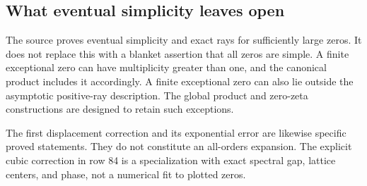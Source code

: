 \subsection{What eventual simplicity leaves open}
The source proves eventual simplicity and exact rays for sufficiently large zeros. It does not replace this with a blanket assertion that all zeros are simple. A finite exceptional zero can have multiplicity greater than one, and the canonical product includes it accordingly. A finite exceptional zero can also lie outside the asymptotic positive-ray description. The global product and zero-zeta constructions are designed to retain such exceptions.

The first displacement correction and its exponential error are likewise specific proved statements. They do not constitute an all-orders expansion. The explicit cubic correction in row 84 is a specialization with exact spectral gap, lattice centers, and phase, not a numerical fit to plotted zeros.
